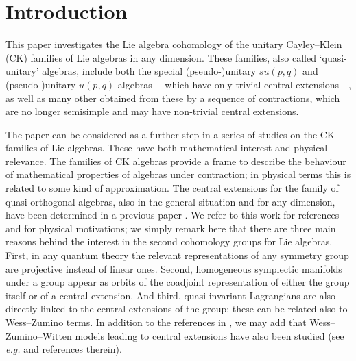 \documentclass[12pt]{article}
\begin{document}
\section{Introduction}

This paper investigates the Lie algebra cohomology of the unitary
Cayley--Klein (CK) families of Lie algebras
in any dimension.  These families, also called `quasi-unitary' algebras,
include both the special \mbox{(pseudo-)}unitary
$su({p,q})$ and \mbox{(pseudo-)}uni\-tary $u({p,q})$ algebras
---which have only trivial central
extensions\mbox{---,} as well as many other obtained from these  by a sequence
of contractions, which are no longer semisimple and may have
non-trivial central extensions.

The paper can be considered as a further step in a
series of studies on the CK families of Lie algebras. These
have both
mathematical interest and physical relevance. The families of CK
algebras provide a frame to describe the behaviour of mathematical
properties of algebras under contraction; in physical terms this is related to
some kind of approximation. The central extensions for the family of
quasi-orthogonal  algebras, also in the general situation and for any
dimension, have been determined in a previous paper \cite{Azc.Her.Bue.San:96}.
We refer to this work for references and for physical
motivations; we simply remark here that there are three main reasons behind the
interest in the second cohomology groups for Lie algebras. First, in any
quantum theory the relevant representations of any symmetry group are
projective instead of linear ones. Second, homogeneous symplectic manifolds
under a group appear as orbits of the coadjoint representation of either the
group itself or of a central extension. And third, quasi-invariant Lagrangians
are also directly linked to the central extensions of the group; these can be
related also to Wess--Zumino terms. In
addition to the references in
\cite{Azc.Her.Bue.San:96}, we may add that Wess--Zumino--Witten models leading
to central extensions have also been studied
(see \emph{e.g.}
\cite{Azc.Izq.Mac:90,Fig.Sta:94} and references therein).
\end{document}
